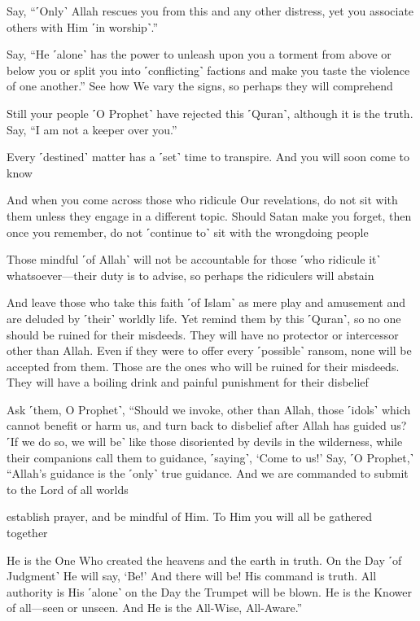 Say, “˹Only˺ Allah rescues you from this and any other distress, yet you associate others with Him ˹in worship˺.”

Say, “He ˹alone˺ has the power to unleash upon you a torment from above or below you or split you into ˹conflicting˺ factions and make you taste the violence of one another.” See how We vary the signs, so perhaps they will comprehend

Still your people ˹O Prophet˺ have rejected this ˹Quran˺, although it is the truth. Say, “I am not a keeper over you.”

Every ˹destined˺ matter has a ˹set˺ time to transpire. And you will soon come to know

And when you come across those who ridicule Our revelations, do not sit with them unless they engage in a different topic. Should Satan make you forget, then once you remember, do not ˹continue to˺ sit with the wrongdoing people

Those mindful ˹of Allah˺ will not be accountable for those ˹who ridicule it˺ whatsoever—their duty is to advise, so perhaps the ridiculers will abstain

And leave those who take this faith ˹of Islam˺ as mere play and amusement and are deluded by ˹their˺ worldly life. Yet remind them by this ˹Quran˺, so no one should be ruined for their misdeeds. They will have no protector or intercessor other than Allah. Even if they were to offer every ˹possible˺ ransom, none will be accepted from them. Those are the ones who will be ruined for their misdeeds. They will have a boiling drink and painful punishment for their disbelief

Ask ˹them, O Prophet˺, “Should we invoke, other than Allah, those ˹idols˺ which cannot benefit or harm us, and turn back to disbelief after Allah has guided us? ˹If we do so, we will be˺ like those disoriented by devils in the wilderness, while their companions call them to guidance, ˹saying˺, ‘Come to us!’ Say, ˹O Prophet,˺ “Allah’s guidance is the ˹only˺ true guidance. And we are commanded to submit to the Lord of all worlds

establish prayer, and be mindful of Him. To Him you will all be gathered together

He is the One Who created the heavens and the earth in truth. On the Day ˹of Judgment˺ He will say, ‘Be!’ And there will be! His command is truth. All authority is His ˹alone˺ on the Day the Trumpet will be blown. He is the Knower of all—seen or unseen. And He is the All-Wise, All-Aware.”

